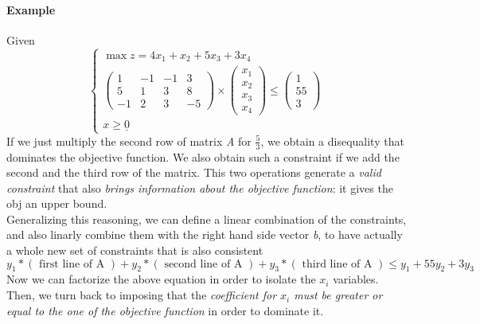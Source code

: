             \paragraph{Example}
                Given
                \begin{equation}
                    \begin{cases}
                        \max z = 4x_1+x_2+5x_3+3x_4 \\
                        \begin{pmatrix}
                            1 & -1 & -1 & 3 \\
                            5 & 1 & 3 & 8 \\
                            -1 & 2 & 3 & -5
                        \end{pmatrix}
                        \times
                        \begin{pmatrix}x_1 \\ x_2 \\ x_3 \\ x_4\end{pmatrix}
                        \leq
                        \begin{pmatrix}1 \\ 55 \\ 3\end{pmatrix} \\
                        x \geq \underline{0} 
                    \end{cases}
                \end{equation}
                If we just multiply the second row of matrix \emph{A} for $\frac{5}{3}$, we obtain a disequality that dominates the objective function. We also obtain such a constraint if we add the second and the third row of the matrix. This two operations generate a \textit{valid constraint} that also \textit{brings information about the objective function}: it gives the obj an upper bound.\\
                Generalizing this reasoning, we can define a linear combination of the constraints, and also linarly combine them with the right hand side vector \emph{b}, to have actually a whole new set of constraints that is also consistent
                \begin{equation}
                    y_1 * (\text{ first line of A }) + y_2 * (\text{ second line of A }) + y_3 * (\text{ third line of A }) \leq y_1 + 55y_2 + 3y_3
                \end{equation}
                Now we can factorize the above equation in order to isolate the $x_i$ variables. Then, we turn back to imposing that the \textit{coefficient for $x_i$ must be greater or equal to the one of the objective function} in order to dominate it.
